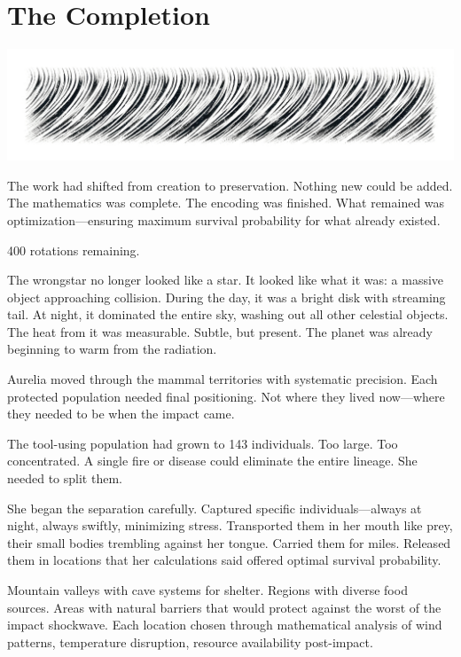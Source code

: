 \chapter{The Completion}
\label{ch:11}



\begin{center}
\includegraphics[width=\textwidth]{images/chapterImages/genesis_sketch_00088_.png}
\end{center}

The work had shifted from creation to preservation. Nothing new could be added. The mathematics was complete. The encoding was finished. What remained was optimization—ensuring maximum survival probability for what already existed.

400 rotations remaining.

The wrongstar no longer looked like a star. It looked like what it was: a massive object approaching collision. During the day, it was a bright disk with streaming tail. At night, it dominated the entire sky, washing out all other celestial objects. The heat from it was measurable. Subtle, but present. The planet was already beginning to warm from the radiation.

Aurelia moved through the mammal territories with systematic precision. Each protected population needed final positioning. Not where they lived now—where they needed to be when the impact came.

\scenebreak

The tool-using population had grown to 143 individuals. Too large. Too concentrated. A single fire or disease could eliminate the entire lineage. She needed to split them.

She began the separation carefully. Captured specific individuals—always at night, always swiftly, minimizing stress. Transported them in her mouth like prey, their small bodies trembling against her tongue. Carried them for miles. Released them in locations that her calculations said offered optimal survival probability.

Mountain valleys with cave systems for shelter. Regions with diverse food sources. Areas with natural barriers that would protect against the worst of the impact shockwave. Each location chosen through mathematical analysis of wind patterns, temperature disruption, resource availability post-impact.

